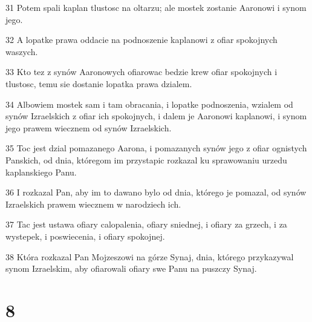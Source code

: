 \par 31 Potem spali kaplan tlustosc na oltarzu; ale mostek zostanie Aaronowi i synom jego.
\par 32 A lopatke prawa oddacie na podnoszenie kaplanowi z ofiar spokojnych waszych.
\par 33 Kto tez z synów Aaronowych ofiarowac bedzie krew ofiar spokojnych i tlustosc, temu sie dostanie lopatka prawa dzialem.
\par 34 Albowiem mostek sam i tam obracania, i lopatke podnoszenia, wzialem od synów Izraelskich z ofiar ich spokojnych, i dalem je Aaronowi kaplanowi, i synom jego prawem wiecznem od synów Izraelskich.
\par 35 Toc jest dzial pomazanego Aarona, i pomazanych synów jego z ofiar ognistych Panskich, od dnia, któregom im przystapic rozkazal ku sprawowaniu urzedu kaplanskiego Panu.
\par 36 I rozkazal Pan, aby im to dawano bylo od dnia, którego je pomazal, od synów Izraelskich prawem wiecznem w narodziech ich.
\par 37 Tac jest ustawa ofiary calopalenia, ofiary sniednej, i ofiary za grzech, i za wystepek, i poswiecenia, i ofiary spokojnej.
\par 38 Która rozkazal Pan Mojzeszowi na górze Synaj, dnia, którego przykazywal synom Izraelskim, aby ofiarowali ofiary swe Panu na puszczy Synaj.

\chapter{8}

